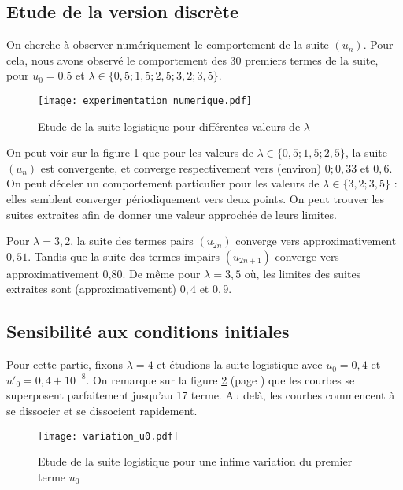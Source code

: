 \subsection{Etude de la version discrète}
On cherche à observer numériquement le comportement de la suite $(u_n)$. Pour cela, nous avons observé le comportement des $30$ premiers termes de la suite, pour $u_0 = 0.5$ et $\lambda\in\{0,5; 1,5; 2,5; 3,2; 3,5\}$.

\begin{figure}[!h]
    \begin{center}
        \texttt{[image: experimentation\_numerique.pdf]}
    \end{center}
    \caption{Etude de la suite logistique pour différentes valeurs de $\lambda$}
    \label{fig:etude_lambdas}
\end{figure}
On peut voir sur la figure \ref{fig:etude_lambdas} que pour les valeurs de $\lambda\in\{0,5; 1,5; 2,5\}$, la suite $(u_n)$ est convergente, et converge respectivement vers (environ) $0; 0,33$ et $0,6$. On peut déceler un comportement particulier pour les valeurs de $\lambda \in\{3,2; 3,5\}$ : elles semblent converger périodiquement vers deux points. On peut trouver les suites extraites afin de donner une valeur approchée de leurs limites.

Pour $\lambda = 3,2$, la suite des termes pairs $(u_{2n})$ converge vers approximativement $0,51$. Tandis que la suite des termes impairs $(u_{2n+1})$ converge vers approximativement 0,80. De même pour $\lambda = 3,5$ où, les limites des suites extraites sont (approximativement) $0,4$ et $0,9$.

\subsection{Sensibilité aux conditions initiales}
Pour cette partie, fixons $\lambda = 4$ et étudions la suite logistique avec $u_0 = 0,4$ et $u'_0 = 0,4 + 10^{-8}$. On remarque sur la figure \ref{fig:etude_u0} (page \pageref{fig:etude_u0}) que les courbes se superposent parfaitement jusqu'au 17\ieme{} terme. Au delà, les courbes commencent à se dissocier et se dissocient rapidement.

\begin{figure}[!h]
    \begin{center}
        \texttt{[image: variation\_u0.pdf]}
    \end{center}
    \caption{Etude de la suite logistique pour une infime variation du premier terme $u_0$}
    \label{fig:etude_u0}
\end{figure}

